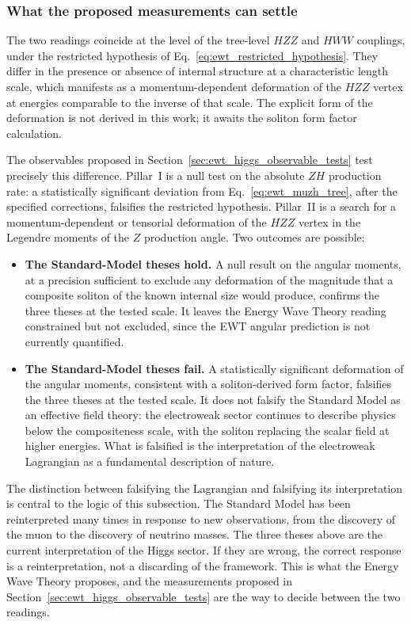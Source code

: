 \documentclass[10pt,a4paper]{article}
\begin{document}
\subsubsection*{What the proposed measurements can settle}

The two readings coincide at the level of the tree-level $HZZ$ and
$HWW$ couplings, under the restricted hypothesis of
Eq.~\eqref{eq:ewt_restricted_hypothesis}. They differ in the
presence or absence of internal structure at a characteristic
length scale, which manifests as a momentum-dependent deformation
of the $HZZ$ vertex at energies comparable to the inverse of that
scale. The explicit form of the deformation is not derived in this
work; it awaits the soliton form factor calculation.

The observables proposed in
Section~\ref{sec:ewt_higgs_observable_tests} test precisely this
difference. Pillar~I is a null test on the absolute $ZH$ production
rate: a statistically significant deviation from
Eq.~\eqref{eq:ewt_muzh_tree}, after the specified corrections,
falsifies the restricted hypothesis. Pillar~II is a search for a
momentum-dependent or tensorial deformation of the $HZZ$ vertex in
the Legendre moments of the $Z$ production angle. Two outcomes are
possible:

\begin{itemize}
	\item \textbf{The Standard-Model theses hold.}
	A null result on the angular moments, at a precision sufficient
	to exclude any deformation of the magnitude that a composite
	soliton of the known internal size would produce, confirms the
	three theses at the tested scale. It leaves the Energy Wave
	Theory reading constrained but not excluded, since the EWT
	angular prediction is not currently quantified.
	
	\item \textbf{The Standard-Model theses fail.}
	A statistically significant deformation of the angular moments,
	consistent with a soliton-derived form factor, falsifies the
	three theses at the tested scale. It does not falsify the
	Standard Model as an effective field theory: the electroweak
	sector continues to describe physics below the compositeness
	scale, with the soliton replacing the scalar field at higher
	energies. What is falsified is the interpretation of the
	electroweak Lagrangian as a fundamental description of nature.
\end{itemize}

The distinction between falsifying the Lagrangian and falsifying
its interpretation is central to the logic of this subsection. The
Standard Model has been reinterpreted many times in response to new
observations, from the discovery of the muon to the discovery of
neutrino masses. The three theses above are the current
interpretation of the Higgs sector. If they are wrong, the correct
response is a reinterpretation, not a discarding of the framework.
This is what the Energy Wave Theory proposes, and the measurements
proposed in Section~\ref{sec:ewt_higgs_observable_tests} are the
way to decide between the two readings.
\end{document}
